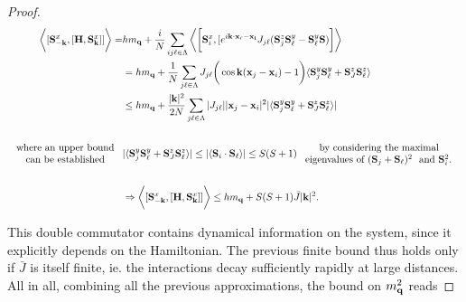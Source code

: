 \documentclass{homework}
\begin{document}
\begin{proof}
\begin{equation}
    \begin{split}
        \bigg \langle [{\bf S}^x_{-{\bf k}}, [{\bf H}, {\bf S}^x_{{\bf k}}]] \bigg \rangle =& h m_{\bf q} + \frac{i}{N} \sum_{ij\ell \in \Lambda}\bigg \langle \bigg[{\bf S}^x_{i}, [e^{i {\bf k} \cdot {\bf x_\ell - x_i}}J_{j\ell} ({\bf S}_j^z {\bf S}_\ell^y - {\bf S}_\ell^y {\bf S})\bigg] \bigg  \rangle \\
        &= h m_{\bf q} + \frac{1}{N} \sum_{j \ell \in \Lambda} J_{j \ell} \bigg( \cos {\bf k} ({\bf x}_j - {\bf x}_i) - 1\bigg) \langle {\bf S}_j^y {\bf S}_\ell^y + {\bf S}_{J}^z {\bf S}_\ell^z \rangle \\
        & \leq h m_{\bf q} + \frac{|{\bf k}|^2}{2N} \sum_{j \ell \in \Lambda} |J_{j\ell}| |{\bf x}_j - {\bf x}_i|^2 |\langle {\bf S}_j^y {\bf S}_\ell^y + {\bf S}_{J}^z {\bf S}_\ell^z \rangle| \\
        \\
        \begin{array}{c}
             \textnormal{ where an upper bound }  \\
             \textnormal{ can be established } 
        \end{array}
        &|\langle {\bf S}_j^y {\bf S}_\ell^y + {\bf S}_{J}^z {\bf S}_\ell^z \rangle| \leq |\langle {\bf S}_{i} \cdot {\bf S}_{\ell}\rangle| \leq S(S+1) \begin{array}{c}
             \textnormal{ by considering the maximal  }  \\
             \textnormal{ eigenvalues of $({\bf S}_j + {\bf S}_{\ell})^2$ }
             \textnormal{ and ${\bf S}_i^2$. }
        \end{array} \\
        \\
        &\Rightarrow  \bigg \langle [{\bf S}^x_{-{\bf k}}, [{\bf H}, {\bf S}^x_{{\bf k}}]] \bigg \rangle \leq h m_{{\bf q}} + S(S+1) \bar{J} |{\bf k}|^2. \label{Bogoliubov_inequality_double_comm}
    \end{split}
\end{equation}

This double commutator contains dynamical information on the system, since it explicitly depends on the Hamiltonian. The previous finite bound thus holds only if $\bar{J}$ is itself finite, ie. the interactions decay sufficiently rapidly at large distances. All in all, combining all the previous approximations, the bound on $m_{\bf q}^2$ reads 


\end{proof}
\end{document}

